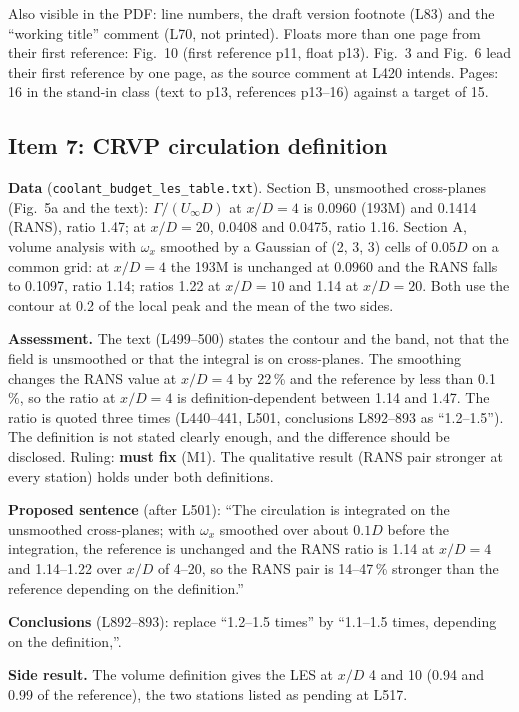 \documentclass[10pt]{article}
\begin{document}
Also visible in the PDF: line numbers, the draft version footnote (L83) and the ``working title'' comment (L70,
not printed). Floats more than one page from their first reference: Fig.~10 (first reference p11, float p13).
Fig.~3 and Fig.~6 lead their first reference by one page, as the source comment at L420 intends. Pages: 16 in the
stand-in class (text to p13, references p13--16) against a target of 15.

\subsection{Item 7: CRVP circulation definition}\label{sec:item7}

\textbf{Data} (\texttt{coolant\_budget\_les\_table.txt}). Section B, unsmoothed cross-planes (Fig.~5a and the
text): $\Gamma/(U_\infty D)$ at $x/D=4$ is 0.0960 (193M) and 0.1414 (RANS), ratio 1.47; at $x/D=20$, 0.0408 and
0.0475, ratio 1.16. Section A, volume analysis with $\omega_x$ smoothed by a Gaussian of (2, 3, 3) cells of
$0.05D$ on a common grid: at $x/D=4$ the 193M is unchanged at 0.0960 and the RANS falls to 0.1097, ratio 1.14;
ratios 1.22 at $x/D=10$ and 1.14 at $x/D=20$. Both use the contour at 0.2 of the local peak and the mean of the
two sides.

\textbf{Assessment.} The text (L499--500) states the contour and the band, not that the field is unsmoothed or
that the integral is on cross-planes. The smoothing changes the RANS value at $x/D=4$ by 22\,\% and the reference
by less than 0.1\,\%, so the ratio at $x/D=4$ is definition-dependent between 1.14 and 1.47. The ratio is quoted
three times (L440--441, L501, conclusions L892--893 as ``1.2--1.5''). The definition is not stated clearly enough,
and the difference should be disclosed. Ruling: \textbf{must fix} (M1). The qualitative result (RANS pair stronger
at every station) holds under both definitions.

\textbf{Proposed sentence} (after L501): ``The circulation is integrated on the unsmoothed cross-planes; with
$\omega_x$ smoothed over about $0.1D$ before the integration, the reference is unchanged and the RANS ratio is 1.14
at $x/D=4$ and 1.14--1.22 over $x/D$ of 4--20, so the RANS pair is 14--47\,\% stronger than the reference
depending on the definition.''

\textbf{Conclusions} (L892--893): replace ``1.2--1.5 times'' by ``1.1--1.5 times, depending on the definition,''.

\textbf{Side result.} The volume definition gives the LES at $x/D$ 4 and 10 (0.94 and 0.99 of the reference),
the two stations listed as pending at L517.
\end{document}
